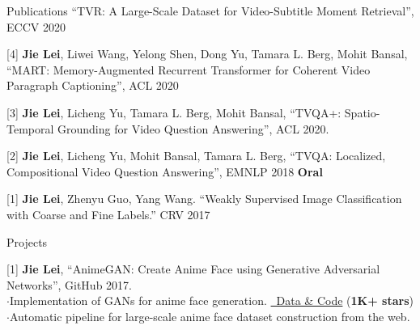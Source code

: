 \documentclass{resume} %
\begin{document}
\begin{rSection}{Publications}
{        ``TVR: A Large-Scale Dataset for Video-Subtitle Moment Retrieval'',
            ECCV 2020 
            } 
   \item {[4] \textbf{Jie Lei}, Liwei Wang, Yelong Shen, Dong Yu, Tamara L. Berg, Mohit Bansal,
         ``MART: Memory-Augmented Recurrent Transformer for Coherent Video Paragraph Captioning'',
         ACL 2020
         }               
   \item {[3] \textbf{Jie Lei}, Licheng Yu, Tamara L. Berg, Mohit Bansal,
               ``TVQA+: Spatio-Temporal Grounding for Video Question Answering'',
               ACL 2020.
               }
    \item {[2] \textbf{Jie Lei}, Licheng Yu, Mohit Bansal, Tamara L. Berg, 
               ``TVQA: Localized, Compositional Video Question Answering'',
               EMNLP 2018 {\color{bittersweet}\textbf{Oral}}
               }
    \item {[1] \textbf{Jie Lei}, Zhenyu Guo, Yang Wang.
                ``Weakly Supervised Image Classification with Coarse and Fine Labels.''
                CRV 2017
                }
\end{rSection}


\begin{rSection}{Projects}
    \item {[1] \textbf{Jie Lei},
                ``AnimeGAN: Create Anime Face using Generative Adversarial Networks'',
                GitHub 2017.
                \\ $\cdot$\quad Implementation of GANs for anime face generation. 
                \href{https://github.com/jayleicn/animeGAN}{\color{codelinkcolor}\faGithub~Data \& Code} (\textbf{1K+ stars})
                \\ $\cdot$\quad Automatic pipeline for large-scale anime face dataset construction from the web.}
\end{rSection}


\end{document}
